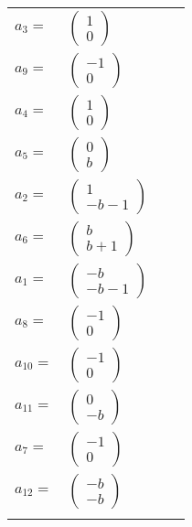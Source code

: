 \documentclass[1p]{elsarticle_modified}
\theoremstyle{definition}
\begin{document}
\begin{tabular}{m{7pt} m{180pt} m{7pt} m{180pt} }
\flushright $a_{3}=$&$\begin{pmatrix}1\\0\end{pmatrix}$ \\
\flushright $a_{9}=$&$\begin{pmatrix}-1\\0\end{pmatrix}$ \\
\flushright $a_{4}=$&$\begin{pmatrix}1\\0\end{pmatrix}$ \\
\flushright $a_{5}=$&$\begin{pmatrix}0\\b\end{pmatrix}$ \\
\flushright $a_{2}=$&$\begin{pmatrix}1\\- b-1\end{pmatrix}$ \\
\flushright $a_{6}=$&$\begin{pmatrix}b\\b+1\end{pmatrix}$ \\
\flushright $a_{1}=$&$\begin{pmatrix}- b\\- b-1\end{pmatrix}$ \\
\flushright $a_{8}=$&$\begin{pmatrix}-1\\0\end{pmatrix}$ \\
\flushright $a_{10}=$&$\begin{pmatrix}-1\\0\end{pmatrix}$ \\
\flushright $a_{11}=$&$\begin{pmatrix}0\\- b\end{pmatrix}$ \\
\flushright $a_{7}=$&$\begin{pmatrix}-1\\0\end{pmatrix}$ \\
\flushright $a_{12}=$&$\begin{pmatrix}- b\\- b\end{pmatrix}$\\&\end{tabular}
\end{document}
